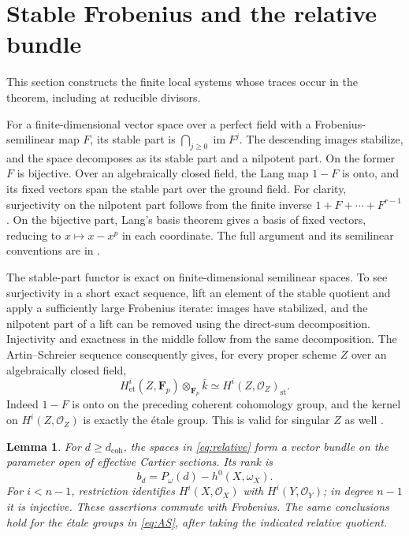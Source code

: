 \documentclass[11pt]{article}
\newtheorem{lemma}[theorem]{Lemma}
\theoremstyle{remark}\newtheorem{remark}[theorem]{Remark}
\newcommand{\OO}{\mathcal O}
\newcommand{\FF}{\mathbf F}
\newcommand{\et}{\mathrm{et}}
\newcommand{\im}{\operatorname{im}}
\begin{document}
\section{Stable Frobenius and the relative bundle}\label{sec:coherent}

This section constructs the finite local systems whose traces occur in the theorem, including at reducible divisors.

For a finite-dimensional vector space over a perfect field with a Frobenius-semilinear map $F$, its stable part is $\bigcap_{j\ge0}\im F^j$. The descending images stabilize, and the space decomposes as its stable part and a nilpotent part. On the former $F$ is bijective. Over an algebraically closed field, the Lang map $1-F$ is onto, and its fixed vectors span the stable part over the ground field. For clarity, surjectivity on the nilpotent part follows from the finite inverse $1+F+\cdots+F^{r-1}$. On the bijective part, Lang's basis theorem gives a basis of fixed vectors, reducing to $x\mapsto x-x^p$ in each coordinate. The full argument and its semilinear conventions are in \citet[Propositions~1.1--1.2, pp.~403--406]{Katz}.

The stable-part functor is exact on finite-dimensional semilinear spaces. To see surjectivity in a short exact sequence, lift an element of the stable quotient and apply a sufficiently large Frobenius iterate: images have stabilized, and the nilpotent part of a lift can be removed using the direct-sum decomposition. Injectivity and exactness in the middle follow from the same decomposition. The Artin--Schreier sequence consequently gives, for every proper scheme $Z$ over an algebraically closed field,
\begin{equation}\label{eq:AS}
 H^i_{\et}(Z,\FF_p)\otimes_{\FF_p}\bar k
       \simeq H^i(Z,\OO_Z)_{\mathrm{st}}.
\end{equation}
Indeed $1-F$ is onto on the preceding coherent cohomology group, and the kernel on $H^i(Z,\OO_Z)$ is exactly the \'etale group. This is valid for singular $Z$ as well \citep[Proposition~2.0 and Corollary~2.1, pp.~406--407]{Katz}.

\begin{lemma}\label{lem:relative}
For $d\ge d_{\mathrm{coh}}$, the spaces in \eqref{eq:relative} form a vector bundle on the parameter open of effective Cartier sections. Its rank is
\begin{equation}\label{eq:rank}
                     b_d=P_\omega(d)-h^0(X,\omega_X).
\end{equation}
For $i<n-1$, restriction identifies $H^i(X,\OO_X)$ with $H^i(Y,\OO_Y)$; in degree $n-1$ it is injective. These assertions commute with Frobenius. The same conclusions hold for the \'etale groups in \eqref{eq:AS}, after taking the indicated relative quotient.
\end{lemma}
\end{document}
